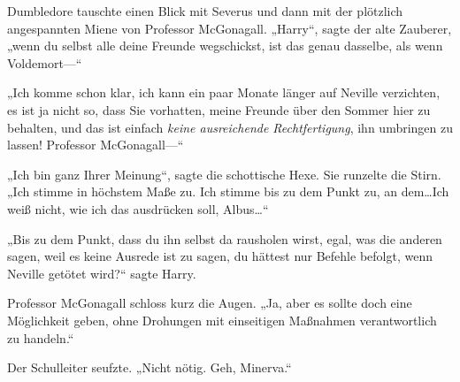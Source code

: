 Dumbledore tauschte einen Blick mit Severus und dann mit der plötzlich angespannten Miene von Professor McGonagall.
„Harry“, sagte der alte Zauberer, „wenn du selbst alle deine Freunde wegschickst, ist das genau dasselbe, als wenn Voldemort—“

„Ich komme schon klar, ich kann ein paar Monate länger auf Neville verzichten, es ist ja nicht so, dass Sie vorhatten, meine Freunde über den Sommer hier zu behalten, und das ist einfach \emph{keine ausreichende Rechtfertigung}, ihn umbringen zu lassen! Professor McGonagall—“

„Ich bin ganz Ihrer Meinung“, sagte die schottische Hexe.
Sie runzelte die Stirn. „Ich stimme in höchstem Maße zu. Ich stimme bis zu dem Punkt zu, an dem…Ich weiß nicht, wie ich das ausdrücken soll, Albus…“

„Bis zu dem Punkt, dass du ihn selbst da rausholen wirst, egal, was die anderen sagen, weil es keine Ausrede ist zu sagen, du hättest nur Befehle befolgt, wenn Neville getötet wird?“ sagte Harry.

Professor McGonagall schloss kurz die Augen. „Ja, aber es sollte doch eine Möglichkeit geben, ohne Drohungen mit einseitigen Maßnahmen verantwortlich zu handeln.“

Der Schulleiter seufzte.
„Nicht nötig. Geh, Minerva.“

